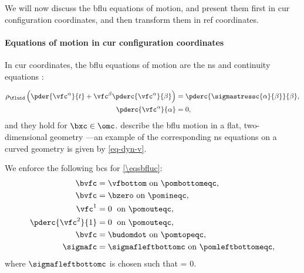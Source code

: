 We will now discuss the \ac{bflu} equations of motion, and present them first in \ac{cur} configuration coordinates, and then transform them in \ac{ref} coordinates.


\paragraph{Equations of motion in  \acl{cur} configuration coordinates}
\label{sec_fl_mem_flu_cur}

In \ac{cur} coordinates, the \ac{bflu} equations of motion are the \ac{ns} and continuity equations \cite{landauFluidMechanics1987}:

\begin{align}
        \label{eq_fl_rigid_fl_1_current}
        \rho_\fluid \left( \pder{\vfc^\alpha}{t} + \vfc^\beta  \pderc{\vfc^\alpha}{\beta} \right) & =  \pderc{  \sigmastressc{\alpha}{\beta}}{\beta} ,                                               \\
        \label{eq_fl_rigid_fl_2_current}
        \pderc{ \vfc^\alpha }{\alpha}                                                             & =                                                              0                               ,
\end{align}
and they hold for $\bxc \in \omc$.
\Cref{\eqsbfluc} describe the \ac{bflu} motion in a flat, two-dimensional geometry \cite{landauFluidMechanics1987}---an example of the corresponding  \ac{ns} equations on a curved geometry is given by \cref{eq-dyn-v}.



We enforce the following \acp{bc} for \cref{\eqsbfluc}:
\begin{align}
        \label{bc_fl_membrane_1_current}
        \bvfc             & =  \vfbottom  \text{ on } \pombottomeqc,            \\
        \label{bc_fl_membrane_2_current}
        \bvfc             & =  \bzero  \text{ on } \pomineqc,                   \\
        \label{bc_fl_membrane_3_current}
        \vfc^1            & =  0 \; \text{ on } \pomouteqc ,                    \\
        \label{bc_fl_membrane_4_current}
        \pderc{\vfc^2}{1} & =  0 \; \text{ on } \pomouteqc ,                    \\
        \label{bc_fl_membrane_5_current}
        \bvfc             & = \budomdot  \text{ on } \pomtopeqc,                \\
        \label{bc_fl_membrane_6_current}
        \sigmafc          & = \sigmafleftbottomc \text{ on } \pomleftbottomeqc,
\end{align}
where $\sigmafleftbottomc$ is chosen such that
\be\label{bc_fl_membrane_7_current}
\rhof {} = 0.
\ee



